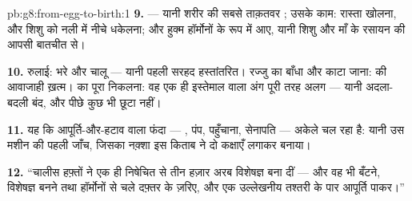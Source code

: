 \begin{solution}{pb:g8:from-egg-to-birth:1}
\textbf{9.}  --- यानी शरीर की सबसे ताक़तवर ; उसके काम:
रास्ता खोलना, और शिशु को नली में नीचे धकेलना; और हुक्म हॉर्मोनों के रूप
में आए, यानी शिशु और माँ के रसायन की आपसी बातचीत से।

\textbf{10.} रुलाई:  भरे और चालू --- यानी पहली सरहद हस्तांतरित।
रज्जु का बाँधा और काटा जाना:  की आवाजाही ख़त्म।  का पूरा निकलना:
वह एक ही इस्तेमाल वाला अंग पूरी तरह अलग --- यानी अदला-बदली बंद, और पीछे
कुछ भी छूटा नहीं।

\textbf{11.} यह कि आपूर्ति-और-हटाव वाला फंदा --- , पंप, पहुँचाना,
सेनापति --- अकेले चल रहा है: यानी उस मशीन की पहली जाँच, जिसका नक़्शा इस
किताब ने दो कक्षाएँ लगाकर बनाया।

\textbf{12.} ``चालीस हफ़्तों ने एक ही निषेचित  से तीन हज़ार अरब
विशेषज्ञ  बना दीं --- और वह भी बँटने, विशेषज्ञ बनने तथा
हॉर्मोनों से चले दफ़्तर के ज़रिए, और एक उल्लेखनीय तश्तरी के पार आपूर्ति
पाकर।''
\end{solution}
